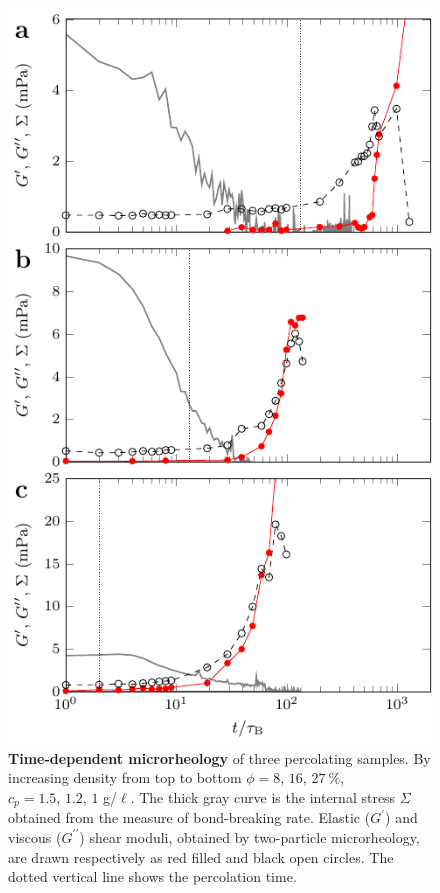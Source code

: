 \documentclass[footinbib,amsmath,amssymb,superscriptaddress,twocolumn]{revtex4}
\begin{document}
\begin{figure}
\includegraphics{figs/microrheology2P.pdf}
\caption{\textbf{Time-dependent microrheology} of three percolating samples.
By increasing density from top to bottom $\phi=8,\,16,\,27~\%$, $c_p=1.5,\,1.2,\, 1$ g/$\mathrm{\ell}$. 
The thick gray curve is the internal stress $\Sigma$ obtained from the measure of bond-breaking rate. 
Elastic ($G^\prime$) and viscous ($G^{\prime\prime}$) shear moduli, obtained by two-particle microrheology, are drawn respectively as red filled and black open circles. 
The dotted vertical line shows the percolation time.
}
\end{figure}
\end{document}
